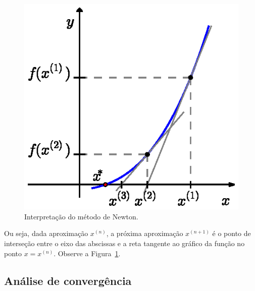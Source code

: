 \begin{figure}[h]
  \centering
  \includegraphics{./cap_equacao1d/pics/metodo_de_Newton/metodo_de_Newton.eps}
  \caption{Interpretação do método de Newton.}
  \label{fig:metodo_de_Newton}
\end{figure}

Ou seja, dada aproximação $x^{(n)}$, a próxima aproximação $x^{(n+1)}$ é o ponto de interseção entre o eixo das abscissas e a reta tangente ao gráfico da função no ponto $x = x^{(n)}$. Observe a Figura~\ref{fig:metodo_de_Newton}.

\subsection{Análise de convergência}\label{Analise_conv_Newton}

